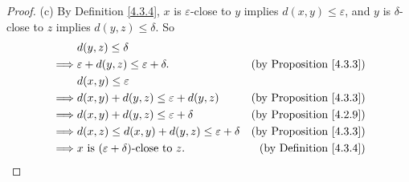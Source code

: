 \begin{proof}{(c)}
    By Definition \ref{4.3.4}, \(x\) is \(\varepsilon\)-close to \(y\) implies \(d(x, y) \leq \varepsilon\), and \(y\) is \(\delta\)-close to \(z\) implies \(d(y, z) \leq \delta\).
    So
    \begin{align*}
                 & d(y, z) \leq \delta                                                                            \\
        \implies & \varepsilon + d(y, z) \leq \varepsilon + \delta.         & \text{(by Proposition \ref{4.3.3})} \\
                 & d(x, y) \leq \varepsilon                                                                       \\
        \implies & d(x, y) + d(y, z) \leq \varepsilon + d(y, z)             & \text{(by Proposition \ref{4.3.3})} \\
        \implies & d(x, y) + d(y, z) \leq \varepsilon + \delta              & \text{(by Proposition \ref{4.2.9})} \\
        \implies & d(x, z) \leq d(x, y) + d(y, z) \leq \varepsilon + \delta & \text{(by Proposition \ref{4.3.3})} \\
        \implies & x \text{ is \((\varepsilon + \delta)\)-close to } z.     & \text{(by Definition \ref{4.3.4})}
    \end{align*}
\end{proof}

